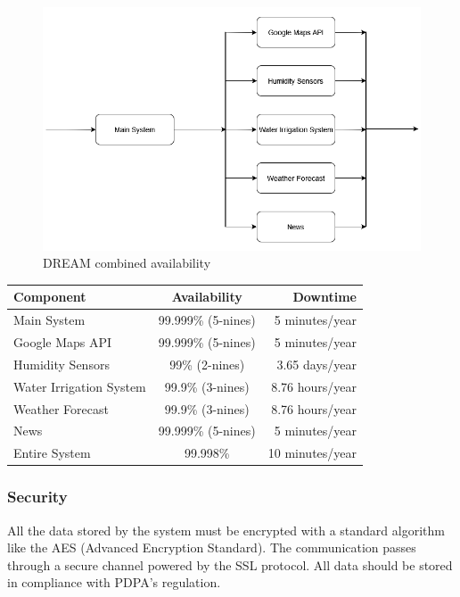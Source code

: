 \documentclass[table, 12pt]{article}
\begin{document}
\begin{center}
    \begin{figure}[!h]
        \includegraphics[scale=0.65, center]{assets/availability.png}
        \caption{DREAM combined availability}
        \label{fig: availability}
    \end{figure}
\end{center}

\begin{table}[H]
    \begin{center}
      \label{tab:availability}
      \begin{tabular}{l|c|r}
        \textbf{Component} & \textbf{Availability} & \textbf{Downtime}\\
        \hline
        Main System & 99.999\% (5-nines) & 5 minutes/year\\
        Google Maps API & 99.999\% (5-nines) & 5 minutes/year\\
        Humidity Sensors & 99\% (2-nines) & 3.65 days/year\\
        Water Irrigation System & 99.9\% (3-nines) & 8.76 hours/year\\
        Weather Forecast & 99.9\% (3-nines) & 8.76 hours/year\\
        News & 99.999\% (5-nines) & 5 minutes/year\\
        \hline
        Entire System & 99.998\% & 10 minutes/year
      \end{tabular}
    \end{center}
\end{table}

\subsubsection{Security}
All the data stored by the system must be encrypted with a standard algorithm like the AES (Advanced Encryption Standard).
The communication passes through a secure channel powered by the SSL protocol.
All data should be stored in compliance with PDPA's regulation.
\end{document}

